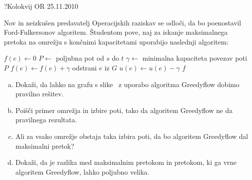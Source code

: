 \begin{naloga}{?}{Kolokvij OR 25.11.2010}
\begin{vprasanje}[greedyflow]
Nov in neizkušen predavatelj Operacijskih raziskav se odloči,
da bo poenostavil Ford-Fulkersonov algoritem.
Študentom pove,
naj za iskanje maksimalnega pretoka na omrežju s končnimi kapacitetami
uporabijo naslednji algoritem:
\begin{small}
\begin{algorithmic}
        \State $f(e) \gets 0$
    \EndFor
        \State $P \gets$ poljubna pot od $s$ do $t$
        \State $\gamma \gets$ minimalna kapaciteta povezav poti $P$
            \State $f(e) \gets f(e) + \gamma$
                \State odstrani $e$ iz $G$
            \Else
                \State $u(e) \gets u(e) - \gamma$
            \EndIf
        \EndFor
    \EndWhile
    \State \Return $f$
\EndFunction
\end{algorithmic}
\end{small}

\begin{enumerate}[(a)]
\item Dokaži,
da lahko na grafu s slike~\fig{}
z uporabo algoritma {\sc Greedyflow} dobimo pravilno rešitev.

\item Poišči primer omrežja in izbire poti,
tako da algoritem {\sc Greedyflow} ne da pravilnega rezultata.

\item Ali za vsako omrežje obstaja taka izbira poti,
da bo algoritem {\sc Greedyflow} dal maksimalni pretok?

\item Dokaži, da je razlika med maksimalnim pretokom in pretokom,
ki ga vrne algoritem {\sc Greedyflow}, lahko poljubno velika.
\end{enumerate}

\begin{slika}
\pgfslika
{}
\end{slika}
\end{vprasanje}
\begin{odgovor}
\end{odgovor}
\end{naloga}


